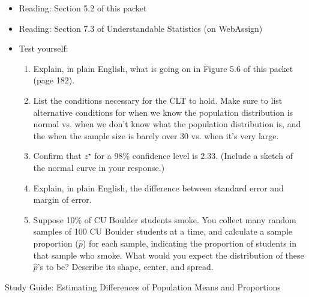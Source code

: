 \documentclass[11pt]{article}
\begin{document}
{\it
\begin{itemize}
\renewcommand{\labelitemi}{{$\ast$}}
\item Reading: Section 5.2 of this packet 
\item Reading: Section 7.3 of Understandable Statistics (on WebAssign)
\item Test yourself: 
{\small
\begin{enumerate}
\item Explain, in plain English, what is going on in Figure 5.6 of this packet (page 182).
\item List the conditions necessary for the CLT to hold. Make sure to list alternative conditions for when we know the population distribution is normal vs. when we don't know what the population distribution is, and the when the sample size is barely over 30 vs. when it's very large.
\item Confirm that $z^{\star}$ for a 98\% confidence level is 2.33. (Include a sketch of the normal curve in your response.)
\item Explain, in plain English, the difference between standard error and margin of error.
\item Suppose 10\% of CU Boulder students smoke. You collect many random samples of 100 CU Boulder students at a time, and calculate a sample proportion ($\hat{p}$) for each sample, indicating the proportion of students in that sample who smoke. What would you expect the distribution of these $\hat{p}$'s to be? Describe its shape, center, and spread.
\end{enumerate}
}
\end{itemize}
}

\noindent
{\Large Study Guide: Estimating Differences of Population Means and Proportions}
\end{document}
